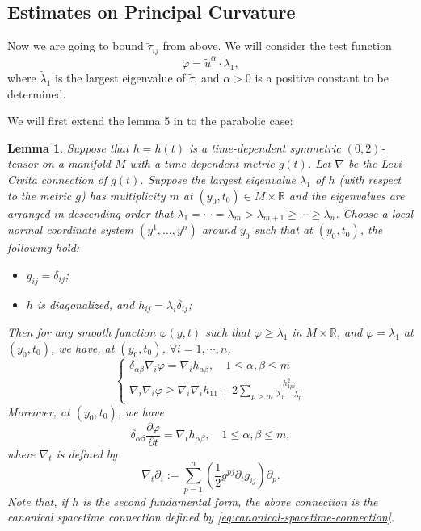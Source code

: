 \documentclass[10pt,a4paper]{amsart}
\newtheorem{lemma}[theorem]{Lemma}
\newcommand{\R}{\ensuremath{\mathbb{R}}}
\newcommand{\pd}[2]{\frac{\partial {#1}}{\partial {#2}}}
\numberwithin{equation}{section}
\begin{document}
\subsection{Estimates on Principal Curvature}
Now we are going to bound \(\tilde{\tau}_{ij}\) from above. We will consider the test function 
\[ \varphi = {\tilde{u}^\alpha}\cdot{\tilde{\lambda}_1}, \]
where \(\tilde{\lambda}_1\) is the largest eigenvalue of \(\tilde{\tau}\), and \(\alpha> 0\) is a positive constant to be determined. 
\par We will first extend the lemma 5 in \cite{Brendle2017} to the parabolic case:
\begin{lemma}\label{lem:Brendle-lem}
    Suppose that \(h = h(t)\) is a time-dependent symmetric \((0,2)\)-tensor on a manifold \(M\) with a time-dependent metric \(g(t)\). Let \(\nabla\) be the Levi-Civita connection of \(g(t)\). Suppose the largest eigenvalue \(\lambda_1\) of \(h\) (with respect to the metric \(g\)) has multiplicity \(m\) at \((y_0,t_0)\in M \times \R\) and the eigenvalues are arranged in descending order that $\lambda_1 = \cdots = \lambda_m > \lambda_{m+1} \geq \cdots \geq \lambda_n$. 
    Choose a local normal coordinate system $(y^1, \dots, y^n)$ around $y_0$ such that at $(y_0, t_0)$, the following hold: 
    \begin{itemize}
        \item $g_{ij} = \delta_{ij}$; 
        \item $h$ is diagonalized, and $h_{ij} = \lambda_i \delta_{ij}$;
    \end{itemize}
    Then for any smooth function \(\varphi(y,t)\) such that \(\varphi \geq \lambda_1\) in \(M \times \R\), and \(\varphi = \lambda_1\) at \((y_0,t_0)\), we have, at \((y_0,t_0)\), \(\forall i=1,\cdots,n\),
    \begin{equation}\label{eq:Brendle-lem}
        \left\{ \begin{aligned}
                \delta_{\alpha\beta}\nabla_i \varphi = \nabla_i h_{\alpha\beta}, \quad 1\leq \alpha,\beta\leq m \\
                \nabla_i \nabla_i \varphi \geq \nabla_i\nabla_i h_{11} + 2\sum_{p>m}\frac{h_{1pi}^2}{\lambda_1 - \lambda_p}
            \end{aligned}\right. 
    \end{equation}
    Moreover, at \((y_0,t_0)\), we have 
    \begin{equation}\label{eq:Brendle-lem-t}
        \delta_{\alpha\beta}\pd{\varphi}{t} = \nabla_{t}h_{\alpha\beta}, \quad 1\leq \alpha,\beta\leq m,
    \end{equation}
    where \(\nabla_t\) is defined by 
    \begin{equation}
    \nabla_t \partial_i:= \sum_{p=1}^{n}\left(\frac{1}{2}g^{pj}\partial_t g_{ij}\right)\partial_p.    
    \end{equation}  
Note that, if $h$ is the second fundamental form, the above connection is  the canonical spacetime connection defined by \eqref{eq:canonical-spacetime-connection}.
 
 \end{lemma}
\end{document}
